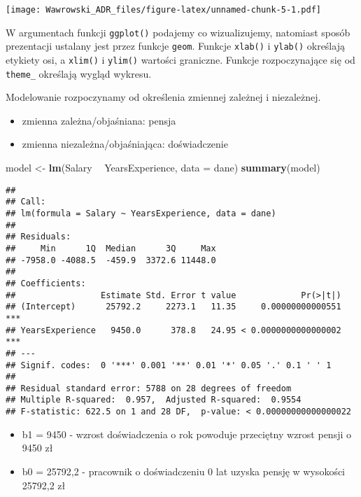\documentclass[]{book}
\newenvironment{Shaded}{\begin{snugshade}}{\end{snugshade}}
\newcommand{\KeywordTok}[1]{\textcolor[rgb]{0.13,0.29,0.53}{\textbf{#1}}}
\newcommand{\DataTypeTok}[1]{\textcolor[rgb]{0.13,0.29,0.53}{#1}}
\newcommand{\StringTok}[1]{\textcolor[rgb]{0.31,0.60,0.02}{#1}}
\newcommand{\OperatorTok}[1]{\textcolor[rgb]{0.81,0.36,0.00}{\textbf{#1}}}
\newcommand{\NormalTok}[1]{#1}
\providecommand{\tightlist}{%
  \setlength{\itemsep}{0pt}\setlength{\parskip}{0pt}}
\begin{document}
\texttt{[image: Wawrowski\_ADR\_files/figure-latex/unnamed-chunk-5-1.pdf]}

W argumentach funkcji \texttt{ggplot()} podajemy co wizualizujemy,
natomiast sposób prezentacji ustalany jest przez funkcje \texttt{geom}.
Funkcje \texttt{xlab()} i \texttt{ylab()} określają etykiety osi, a
\texttt{xlim()} i \texttt{ylim()} wartości graniczne. Funkcje
rozpoczynające się od \texttt{theme\_} określają wygląd wykresu.

Modelowanie rozpoczynamy od określenia zmiennej zależnej i niezależnej.

\begin{itemize}
\tightlist
\item
  zmienna zależna/objaśniana: pensja
\item
  zmienna niezależna/objaśniająca: doświadczenie
\end{itemize}

\begin{Shaded}
\begin{Highlighting}[]
\NormalTok{model <-}\StringTok{ }\KeywordTok{lm}\NormalTok{(Salary }\OperatorTok{~}\StringTok{ }\NormalTok{YearsExperience, }\DataTypeTok{data =}\NormalTok{ dane)}
\KeywordTok{summary}\NormalTok{(model)}
\end{Highlighting}
\end{Shaded}

\begin{verbatim}
## 
## Call:
## lm(formula = Salary ~ YearsExperience, data = dane)
## 
## Residuals:
##     Min      1Q  Median      3Q     Max 
## -7958.0 -4088.5  -459.9  3372.6 11448.0 
## 
## Coefficients:
##                 Estimate Std. Error t value             Pr(>|t|)    
## (Intercept)      25792.2     2273.1   11.35     0.00000000000551 ***
## YearsExperience   9450.0      378.8   24.95 < 0.0000000000000002 ***
## ---
## Signif. codes:  0 '***' 0.001 '**' 0.01 '*' 0.05 '.' 0.1 ' ' 1
## 
## Residual standard error: 5788 on 28 degrees of freedom
## Multiple R-squared:  0.957,  Adjusted R-squared:  0.9554 
## F-statistic: 622.5 on 1 and 28 DF,  p-value: < 0.00000000000000022
\end{verbatim}

\begin{itemize}
\tightlist
\item
  b1 = 9450 - wzrost doświadczenia o rok powoduje przeciętny wzrost
  pensji o 9450 zł
\item
  b0 = 25792,2 - pracownik o doświadczeniu 0 lat uzyska pensję w
  wysokości 25792,2 zł
\end{itemize}
\end{document}
